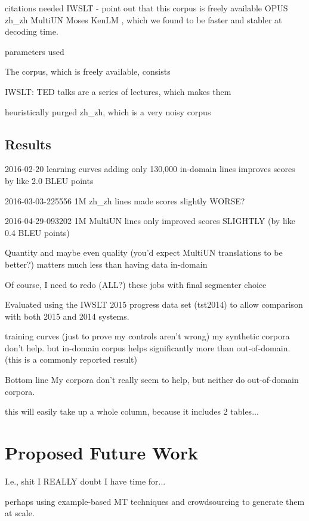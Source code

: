 citations needed
IWSLT  - point out that this corpus is freely available
OPUS zh\_zh  MultiUN 
Moses 
KenLM , which we found to be faster and stabler at decoding time.

parameters used

The corpus, which is freely available, consists 

IWSLT: TED talks are a series of lectures, which makes them 



heuristically purged zh\_zh, which is a very noisy corpus

\subsection{Results}

2016-02-20 learning curves adding only 130,000 in-domain lines improves scores by like 2.0 BLEU points

2016-03-03-225556 1M zh\_zh lines made scores slightly WORSE?

2016-04-29-093202 1M MultiUN lines only improved scores SLIGHTLY (by like 0.4 BLEU points)

Quantity and maybe even quality (you'd expect MultiUN translations to be better?) matters much less than having data in-domain

Of course, I need to redo (ALL?) these jobs with final segmenter choice

Evaluated using the IWSLT 2015 progress data set (tst2014) to allow comparison with both 2015 and 2014 systems.

training curves (just to prove my controls aren't wrong)
my synthetic corpora don't help. 
but in-domain corpus helps significantly more than out-of-domain. (this is a commonly reported result)

Bottom line
My corpora don't really seem to help, but neither do out-of-domain corpora.

this will easily take up a whole column, because it includes 2 tables...

\section{Proposed Future Work}

I.e., shit I REALLY doubt I have time for...


perhaps using example-based MT techniques  and crowdsourcing to generate them at scale.

